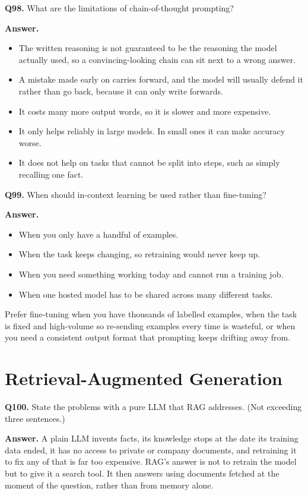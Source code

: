 \documentclass[11pt]{article}
\begin{document}
\medskip
\textbf{Q98.} What are the limitations of chain-of-thought prompting?

\textbf{Answer.}
\begin{itemize}
  \item The written reasoning is not guaranteed to be the reasoning the model actually used, so a convincing-looking chain can sit next to a wrong answer.
  \item A mistake made early on carries forward, and the model will usually defend it rather than go back, because it can only write forwards.
  \item It costs many more output words, so it is slower and more expensive.
  \item It only helps reliably in large models. In small ones it can make accuracy worse.
  \item It does not help on tasks that cannot be split into steps, such as simply recalling one fact.
\end{itemize}

\medskip
\textbf{Q99.} When should in-context learning be used rather than fine-tuning?

\textbf{Answer.}
\begin{itemize}
  \item When you only have a handful of examples.
  \item When the task keeps changing, so retraining would never keep up.
  \item When you need something working today and cannot run a training job.
  \item When one hosted model has to be shared across many different tasks.
\end{itemize}

Prefer fine-tuning when you have thousands of labelled examples, when the task is fixed and
high-volume so re-sending examples every time is wasteful, or when you need a consistent
output format that prompting keeps drifting away from.

\section{Retrieval-Augmented Generation}

\textbf{Q100.} State the problems with a pure LLM that RAG addresses. (Not exceeding three
sentences.)

\textbf{Answer.} A plain LLM invents facts, its knowledge stops at the date its training data
ended, it has no access to private or company documents, and retraining it to fix any of that
is far too expensive. RAG's answer is not to retrain the model but to give it a search tool.
It then answers using documents fetched at the moment of the question, rather than from memory
alone.
\end{document}
